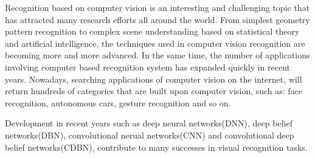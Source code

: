 \documentclass{iitthesis}
\begin{document}
Recognition based on computer vision is an interesting and challenging topic that has attracted many research efforts all around the world. From simplest geometry pattern recognition to complex scene understanding based on statistical theory and artificial intelligence, the techniques used in computer vision recognition are becoming more and more advanced. In the same time, the number of applications involving computer based recognition system has expanded quickly in recent years. Nowadays, searching applications of computer vision on the internet, will return hundreds of categories that are built upon computer vision, such as: face recognition, autonomous cars, gesture recognition and so on.

Development in recent years such as deep neural networks(DNN)\cite{HK:89}, deep belief networks(DBN)\cite{HG:06}, convolutional nerual networks(CNN)\cite{LY:98} and convolutional deep belief networks(CDBN)\cite{LH:09}, contribute to many successes in visual recognition tasks.

\end{document}
